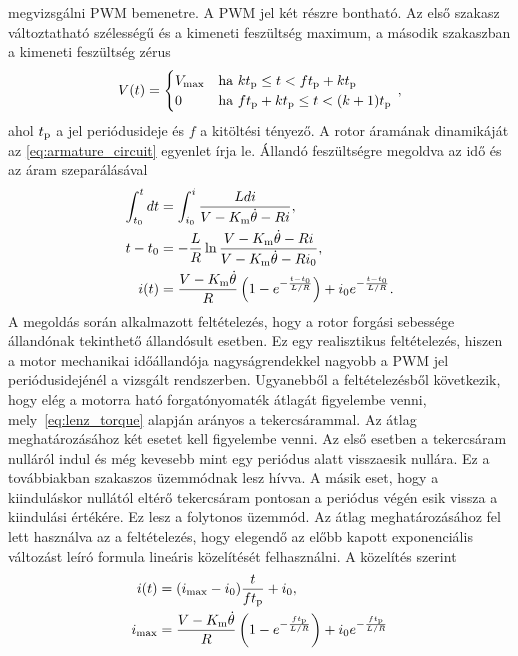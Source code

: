 megvizsgálni PWM bemenetre. A PWM jel két részre bontható. Az első szakasz változtatható szélességű és a 
kimeneti feszültség maximum, a második szakaszban a kimeneti feszültség zérus 
\begin{equation}
    V(t) = 
    \begin{cases}
        V_{\mathrm{max}} & \text{ha } kt_{\mathrm{p}} \le t < ft_{\mathrm{p}} + kt_{\mathrm{p}} \\
        0 & \text{ha } ft_{\mathrm{p}} + kt_{\mathrm{p}} \le t < (k+1)t_{\mathrm{p}}
    \end{cases}\,,
\end{equation}
ahol \(t_{\mathrm{p}}\) a jel periódusideje és \(f\) a kitöltési tényező.
A rotor áramának dinamikáját az \eqref{eq:armature_circuit} egyenlet írja le. 
Állandó feszültségre megoldva az idő és az áram szeparálásával
\begin{equation}
    \begin{split}
    \int_{t_0}^{t} dt &= \int_{i_0}^{i} \frac{L di}{V-K_{\mathrm{m}}\dot\theta - Ri}, \\
    t - t_0 &= -\frac{L}{R} \ln \frac{V-K_{\mathrm{m}}\dot\theta-Ri}{V-K_{\mathrm{m}}\dot\theta-Ri_0}, \\
    i(t) &= \frac{V-K_{\mathrm{m}}\dot\theta}{R}\left(1-e^{-\frac{t-t_0}{L/R}} \right) + i_0 e^{-\frac{t-t_0}{L/R}}. 
    \end{split}
\end{equation}
A megoldás során alkalmazott feltételezés, hogy a rotor forgási sebessége állandónak tekinthető állandósult esetben. 
Ez egy realisztikus feltételezés, hiszen a motor mechanikai időállandója nagyságrendekkel nagyobb a PWM jel periódusidejénél 
a vizsgált rendszerben. Ugyanebből a feltételezésből következik, hogy elég a motorra ható forgatónyomaték átlagát figyelembe venni, 
mely~\eqref{eq:lenz_torque} alapján arányos a tekercsárammal. Az átlag meghatározásához két esetet kell figyelembe venni. 
Az első esetben a tekercsáram nulláról indul és még kevesebb mint egy periódus alatt visszaesik nullára. Ez a továbbiakban szakaszos üzemmódnak 
lesz hívva. A másik eset, hogy a kiinduláskor nullától eltérő tekercsáram pontosan a periódus végén esik vissza a kiindulási értékére. 
Ez lesz a folytonos üzemmód. Az átlag meghatározásához fel lett használva az a feltételezés, hogy elegendő az előbb kapott 
exponenciális változást leíró formula lineáris közelítését felhasználni. A közelítés szerint 
\begin{equation}
    \begin{split}
        i(t) &= (i_{\mathrm{max}} - i_0)\frac{t}{ft_{\mathrm{p}}} + i_0, \\
        i_{\mathrm{max}} &= \frac{V-K_{\mathrm{m}}\dot\theta}{R}\left(1-e^{-\frac{ft_{\mathrm{p}}}{L/R}} \right) + i_0 e^{-\frac{ft_{\mathrm{p}}}{L/R}}
    \end{split}
\end{equation}
